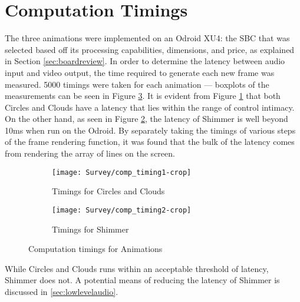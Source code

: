 \documentclass[../initial_thesis.tex]{subfiles}
\begin{document}
\section{Computation Timings} \label{sec:timings}
The three animations were implemented on an Odroid XU4: the SBC that was selected based off its processing capabilities, dimensions, and price, as explained in Section \ref{sec:boardreview}. In order to determine the latency between audio input and video output, the time required to generate each new frame was measured. 5000 timings were taken for each animation --- boxplots of the measurements can be seen in Figure \ref{fig:comp_timings}. It is evident from Figure \ref{fig:timings_circlesclouds} that both Circles and Clouds have a latency that lies within the range of control intimacy. On the other hand, as seen in Figure \ref{fig:timings_shimmer}, the latency of Shimmer is well beyond 10ms when run on the Odroid. By separately taking the timings of various steps of the frame rendering function, it was found that the bulk of the latency comes from rendering the array of lines on the screen.

\begin{figure}
  \begin{subfigure}{0.5\textwidth}
    \centering
    \texttt{[image: Survey/comp\_timing1-crop]}
    \caption{Timings for Circles and Clouds}
    \label{fig:timings_circlesclouds}
  \end{subfigure}
  \begin{subfigure}{0.5\textwidth}
    \centering
    \texttt{[image: Survey/comp\_timing2-crop]}
    \caption{Timings for Shimmer}
    \label{fig:timings_shimmer}
  \end{subfigure}
  \caption{Computation timings for Animations}
  \label{fig:comp_timings}
\end{figure}

While Circles and Clouds runs within an acceptable threshold of latency, Shimmer does not. A potential means of reducing the latency of Shimmer is discussed in \ref{sec:lowlevelaudio}. 
\end{document}
